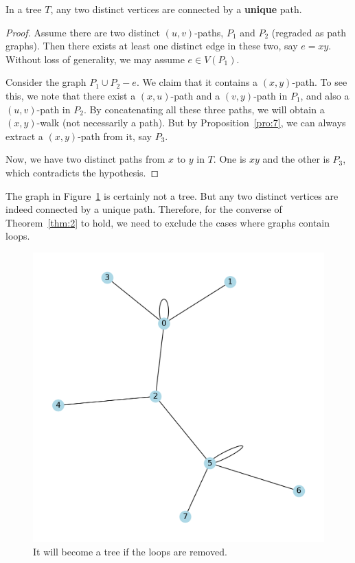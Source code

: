 \documentclass[thmcnt=section, 12pt, color=cyan]{my-elegantbook}
\begin{document}


\begin{theorem} \label{thm:2}
    In a tree $T$, any two distinct vertices are connected by 
	a \textbf{unique} path.
\end{theorem}

\begin{proof}
    Assume there are two distinct $(u,v)$-paths, 
	$P_1$ and  $P_2$ (regraded as path graphs). 
	Then there exists at least one distinct edge 
	in these two, say $e=xy$.
	Without loss of generality,
	we may assume  $e \in V(P_1)$.
	
	Consider the graph $P_1 \cup P_2 - e$.
	We claim that it contains a $(x,y)$-path.
	To see this, we note that there exist a $(x,u)$-path 
	and a $(v,y)$-path in  $P_1$,
	and also a  $(u,v)$-path in $P_2$.
	By concatenating all these three paths, 
	we will obtain a $(x,y)$-walk (not necessarily a path).
	But by Proposition~\ref{pro:7}, 
	we can always extract a $(x,y)$-path from it, say $P_3$.

	Now, we have two distinct paths from $x$ to $y$ in $T$. 
	One is $xy$ and the other is  $P_3$, 
	which contradicts the hypothesis.
\end{proof}


The graph in Figure~\ref{fig:4} is certainly not a tree.
But any two distinct vertices are indeed connected by 
a unique path.
Therefore, for the converse of Theorem~\ref{thm:2} to hold, 
we need to exclude the cases where graphs contain loops.

\begin{figure}[ht]
    \centering
    \includegraphics[scale=0.5]{figures/g-004.png}
    \caption{It will become a tree if the loops are removed.}
    \label{fig:4}
\end{figure}
\end{document}
